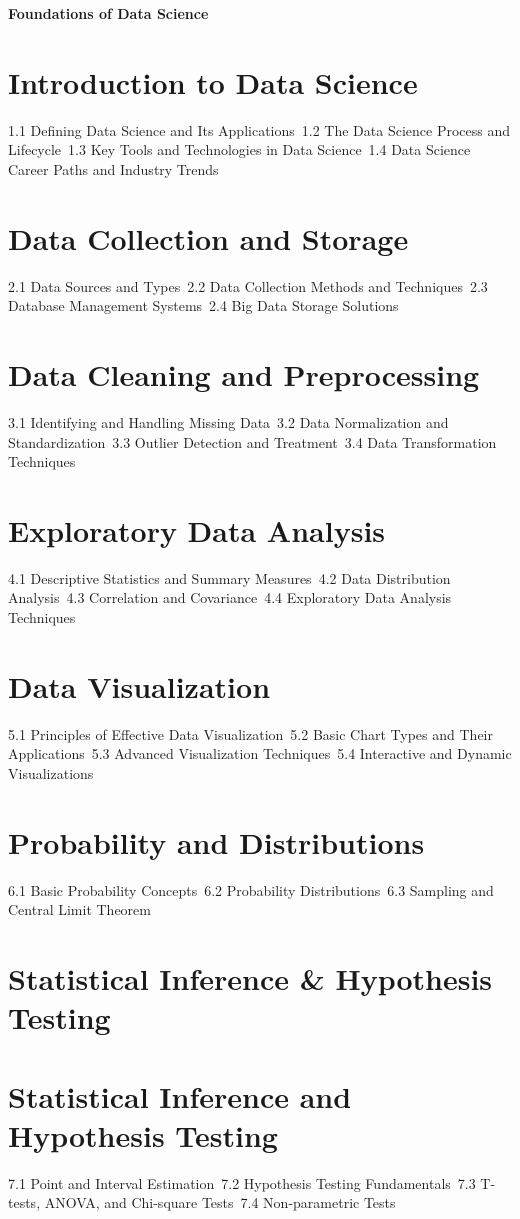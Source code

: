{\LARGE \bf{Foundations of Data Science}}
\section{Introduction to Data Science}
1.1 Defining Data Science and Its Applications\
1.2 The Data Science Process and Lifecycle\
1.3 Key Tools and Technologies in Data Science\
1.4 Data Science Career Paths and Industry Trends\
\section{Data Collection and Storage}
2.1 Data Sources and Types\
2.2 Data Collection Methods and Techniques\
2.3 Database Management Systems\
2.4 Big Data Storage Solutions\
\section{Data Cleaning and Preprocessing}
3.1 Identifying and Handling Missing Data\
3.2 Data Normalization and Standardization\
3.3 Outlier Detection and Treatment\
3.4 Data Transformation Techniques\
\section{Exploratory Data Analysis}
4.1 Descriptive Statistics and Summary Measures\
4.2 Data Distribution Analysis\
4.3 Correlation and Covariance\
4.4 Exploratory Data Analysis Techniques\
\section{Data Visualization}
5.1 Principles of Effective Data Visualization\
5.2 Basic Chart Types and Their Applications\
5.3 Advanced Visualization Techniques\
5.4 Interactive and Dynamic Visualizations\
\section{Probability and Distributions}
6.1 Basic Probability Concepts\
6.2 Probability Distributions\
6.3 Sampling and Central Limit Theorem\
\section{Statistical Inference \& Hypothesis Testing}
\section{Statistical Inference and Hypothesis Testing}
7.1 Point and Interval Estimation\
7.2 Hypothesis Testing Fundamentals\
7.3 T-tests, ANOVA, and Chi-square Tests\
7.4 Non-parametric Tests\
